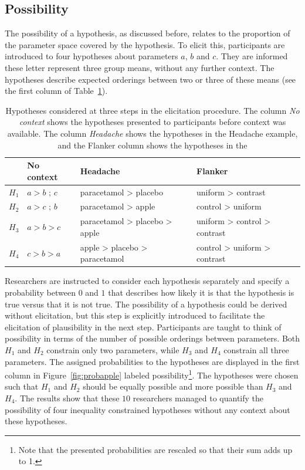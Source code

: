 \documentclass[man]{apa6}
\begin{document}
\subsection{Possibility}
The possibility of a hypothesis, as discussed before, relates to the proportion of the parameter space covered by the hypothesis.
To elicit this, participants are introduced to four hypotheses about parameters $a$, $b$ and $c$.
They are informed these letter represent three group means, without any further context.
The hypotheses describe expected orderings between two or three of these means (see the first column of Table~\ref{tab:hypsExperiment}).
\begin{table}
\begin{tabular}{ l l l l}
	\hline
	 &No context & Headache & Flanker \\
	\hline
	$H_1$& $a > b$ ; $c$ & paracetamol > placebo & uniform > contrast\\
	$H_2$ &$  a > c$ ; $b$&paracetamol > apple &  control > uniform\\
	$H_3$ &$  a > b > c$&  paracetamol > placebo > apple & uniform > control > contrast\\
	$H_4$ &$ c > b> a$&  apple > placebo > paracetamol & control > uniform > contrast\\
	\hline
\end{tabular}
	\caption{Hypotheses considered at three steps in the elicitation procedure. The column \textit{No context} shows the hypotheses presented to participants before context was available. The column \textit{Headache} shows the hypotheses in the Headache example, and the Flanker column shows the hypotheses in the }
	\label{tab:hypsExperiment}
\end{table}

Researchers are instructed to consider each hypothesis separately and specify a probability between $0$ and $1$ that describes how likely it is that the hypothesis is true versus that it is not true.
The possibility of a hypothesis could be derived without elicitation, but this step is explicitly introduced to facilitate the elicitation of plausibility in the next step.
Participants are taught to think of possibility in terms of the number of possible orderings between parameters.
Both $H_1$ and $H_2$ constrain only two parameters, while $H_3$ and $H_4$ constrain all three parameters.
The assigned probabilities to the hypotheses are displayed in the first column in Figure~\ref{fig:probapple} labeled possibility\footnote{Note that the presented probabilities are rescaled so that their sum adds up to 1.}.
The hypotheses were chosen such that $H_1$ and $H_2$ should be equally possible and more possible than $H_3$ and $H_4$.
The results show that these $10$ researchers managed to quantify the possibility of four inequality constrained hypotheses without any context about these hypotheses.
\end{document}
